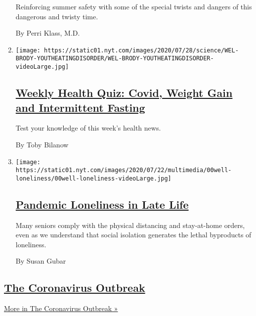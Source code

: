 \begin{enumerate}
  Reinforcing summer safety with some of the special twists and dangers
  of this dangerous and twisty time.

  By Perri Klass, M.D.
\item
  \texttt{[image: https://static01.nyt.com/images/2020/07/28/science/WEL-BRODY-YOUTHEATINGDISORDER/WEL-BRODY-YOUTHEATINGDISORDER-videoLarge.jpg]}

  \hypertarget{weekly-health-quiz-covid-weight-gain-and-intermittent-fasting}{%
  \subsection{\texorpdfstring{\href{/interactive/2020/07/31/well/live/31healthquiz-07312020.html}{Weekly
  Health Quiz: Covid, Weight Gain and Intermittent
  Fasting}}{Weekly Health Quiz: Covid, Weight Gain and Intermittent Fasting}}\label{weekly-health-quiz-covid-weight-gain-and-intermittent-fasting}}

  Test your knowledge of this week's health news.

  By Toby Bilanow
\item
  \texttt{[image: https://static01.nyt.com/images/2020/07/22/multimedia/00well-loneliness/00well-loneliness-videoLarge.jpg]}

  \hypertarget{pandemic-loneliness-in-late-life}{%
  \subsection{\texorpdfstring{\href{/2020/07/30/well/mind/pandemic-loneliness-in-late-life.html}{Pandemic
  Loneliness in Late
  Life}}{Pandemic Loneliness in Late Life}}\label{pandemic-loneliness-in-late-life}}

  Many seniors comply with the physical distancing and stay-at-home
  orders, even as we understand that social isolation generates the
  lethal byproducts of loneliness.

  By Susan Gubar
\end{enumerate}

\hypertarget{the-coronavirus-outbreak}{%
\subsection{\texorpdfstring{\href{/news-event/coronavirus}{The
Coronavirus
Outbreak}}{The Coronavirus Outbreak}}\label{the-coronavirus-outbreak}}

\href{/news-event/coronavirus}{More in The Coronavirus Outbreak »}

